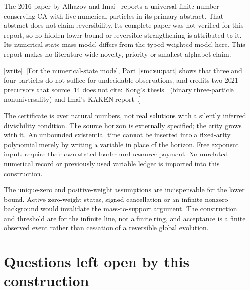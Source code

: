 \documentclass[11pt,letterpaper]{article}
\numberwithin{equation}{section}
\theoremstyle{definition}
\theoremstyle{remark}
\newcommand{\wtag}{\textup{[write]}}
\begin{document}
The 2016 paper by Alhazov and Imai~\cite{alhazovimai} reports a universal finite number-conserving CA with five numerical particles in its primary abstract. That abstract does not claim reversibility. Its complete paper was not verified for this report, so no hidden lower bound or reversible strengthening is attributed to it. Its numerical-state mass model differs from the typed weighted model here. This report makes no literature-wide novelty, priority or smallest-alphabet claim.

\wtag\ [For the numerical-state model, Part~\ref{smc:su:part} shows that three and four particles do not suffice for undecidable observations, and credits two 2021 precursors that source~14 does not cite: Kong's thesis~\cite{kongthesis} (binary three-particle nonuniversality) and Imai's KAKEN report~\cite{kakenfinal}.]

The certificate is over natural numbers, not real solutions with a silently inferred divisibility condition. The source horizon is externally specified; the arity grows with it. An unbounded existential time cannot be inserted into a fixed-arity polynomial merely by writing a variable in place of the horizon. Free exponent inputs require their own stated loader and resource payment. No unrelated numerical record or previously used variable ledger is imported into this construction.

The unique-zero and positive-weight assumptions are indispensable for the lower bound. Active zero-weight states, signed cancellation or an infinite nonzero background would invalidate the mass-to-support argument. The construction and threshold are for the infinite line, not a finite ring, and acceptance is a finite observed event rather than cessation of a reversible global evolution.

\section{Questions left open by this construction}\label{smc:tm:sec:questions}
\end{document}
